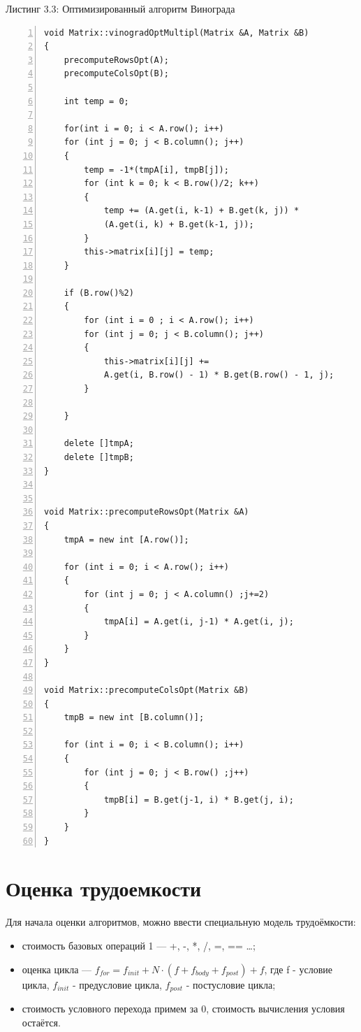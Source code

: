 \documentclass[12pt,a4paper]{report}
\begin{document}
\noindent\textrm{Листинг 3.3: Оптимизированный алгоритм Винограда}
\begin{lstlisting}[frame=single, numbers=left]
void Matrix::vinogradOptMultipl(Matrix &A, Matrix &B)
{
    precomputeRowsOpt(A);
    precomputeColsOpt(B);
	
    int temp = 0;
	
    for(int i = 0; i < A.row(); i++)
    for (int j = 0; j < B.column(); j++)
    {
        temp = -1*(tmpA[i], tmpB[j]);
        for (int k = 0; k < B.row()/2; k++)
        {
            temp += (A.get(i, k-1) + B.get(k, j)) *
            (A.get(i, k) + B.get(k-1, j));
        }
        this->matrix[i][j] = temp;
    }
	
    if (B.row()%2)
    {
        for (int i = 0 ; i < A.row(); i++)
        for (int j = 0; j < B.column(); j++)
        {
            this->matrix[i][j] += 
            A.get(i, B.row() - 1) * B.get(B.row() - 1, j);
        }
		
    }
	
    delete []tmpA;
    delete []tmpB;
}


void Matrix::precomputeRowsOpt(Matrix &A)
{
    tmpA = new int [A.row()];
	
    for (int i = 0; i < A.row(); i++)
    {
        for (int j = 0; j < A.column() ;j+=2)
        {
            tmpA[i] = A.get(i, j-1) * A.get(i, j);
        }
    }
}

void Matrix::precomputeColsOpt(Matrix &B)
{
    tmpB = new int [B.column()];
	
    for (int i = 0; i < B.column(); i++)
    {
        for (int j = 0; j < B.row() ;j++)
        {
            tmpB[i] = B.get(j-1, i) * B.get(j, i);
        }
    }
}
\end{lstlisting}

\section{Оценка трудоемкости}

Для начала оценки алгоритмов, можно ввести специальную модель трудоёмкости:
\begin{itemize}
	\item стоимость базовых операций 1 — +, -, *, /, =, == \dots ;
	\item оценка цикла — $f_{for} = f_{init} + N \cdot (f + f_{body} + f_{post}) + f$, где 
	f - условие цикла, $f_{init}$ - предусловие цикла, $f_{post}$ - постусловие цикла;
	\item стоимость условного перехода примем за 0, стоимость вычисления условия остаётся.
\end{itemize}
\end{document}
